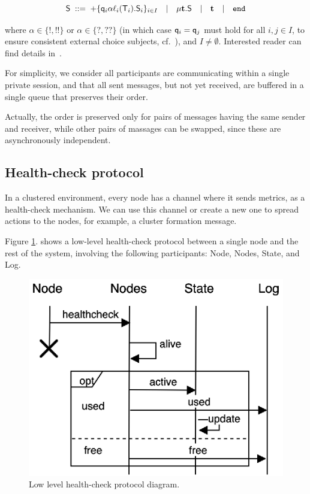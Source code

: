 \begin{equation}
	{\mathsf S} \; ::= \; 
	{+}\{{\sf q}_i\alpha\ell_i({\mathsf T}_i).{\mathsf S}_i\}_{i\in I}  \quad | \quad 
	\mu \textbf{t}.{\mathsf S} \quad | \quad 
	\textbf{t} \quad | \quad
	\mathtt{end}
\end{equation}

where $\alpha\in\{{!}, {!!}\}$ or  $\alpha\in\{{?}, {??}\}$ (in which case ${\sf q}_i={\sf q}_j$ must hold for all $i,j \in I$, to ensure consistent external choice subjects, cf.~\cite[Page 6.]{HuY17}), and $I\not=\emptyset$.
Interested reader can find details in~\cite{HuY17}.

For simplicity, we consider all participants are communicating within a single private session, and that all sent messages, but not yet received, are buffered in a single queue that preserves their order. 

Actually, the order is preserved only for pairs of messages having the same sender and receiver, while other pairs of massages can be swapped, since these are asynchronously independent.
%
%
\subsection{Health-check protocol}\label{sec:health_check_protocol}
%
In a clustered environment, every node has a channel where it sends metrics, as a health-check mechanism. We can use this channel or create a new one to spread actions to the nodes, for example, a cluster formation message. 

Figure \ref{fig:fig6}. shows a low-level health-check protocol between a single node and the rest of the system, involving the following participants: Node, Nodes, State, and Log.

\begin{figure}[H]
	\begin{center}
		\includegraphics[scale=0.75]{images/FIG2}
	\end{center}
	\vspace{-0.7cm}
	\caption{Low level health-check protocol diagram.}
	\label{fig:fig6}
\end{figure} 

